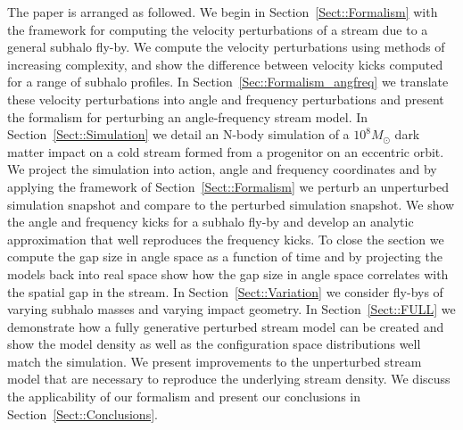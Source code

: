 \documentclass[useAMS,usenatbib,fleqn,a4paper]{mn2e}
\begin{document}
The paper is arranged as followed. We begin in Section~\ref{Sect::Formalism} with the framework for computing the velocity perturbations of a stream due to a general subhalo fly-by. We compute the velocity perturbations using methods of increasing complexity, and show the difference between velocity kicks computed for a range of subhalo profiles. In Section~\ref{Sec::Formalism_angfreq} we translate these velocity perturbations into angle and frequency perturbations and present the formalism for perturbing an angle-frequency stream model. In Section~\ref{Sect::Simulation} we detail an N-body simulation of a $10^8M_\odot$ dark matter impact on a cold stream formed from a progenitor on an eccentric orbit. We project the simulation into action, angle and frequency coordinates and by applying the framework of Section~\ref{Sect::Formalism} we perturb an unperturbed simulation snapshot and compare to the perturbed simulation snapshot. We show the angle and frequency kicks for a subhalo fly-by and develop an analytic approximation that well reproduces the frequency kicks. To close the section we compute the gap size in angle space as a function of time and by projecting the models back into real space show how the gap size in angle space correlates with the spatial gap in the stream.  In Section~\ref{Sect::Variation} we consider fly-bys of varying subhalo masses and varying impact geometry. In Section~\ref{Sect::FULL} we demonstrate how a fully generative perturbed stream model can be created and show the model density as well as the configuration space distributions well match the simulation. We present improvements to the unperturbed stream model that are necessary to reproduce the underlying stream density. We discuss the applicability of our formalism and present our conclusions in Section~\ref{Sect::Conclusions}.
\end{document}
